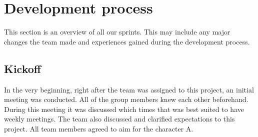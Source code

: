 \chapter{Development process}
\label{sec:sprintOverview}
This section is an overview of all our sprints. This may include any major changes the team made and experiences gained during the development process. 

\section{Kickoff}
In the very beginning, right after the team was assigned to this project, an initial meeting was conducted. All of the group members knew each other beforehand. During this meeting it was discussed which times that was best suited to have weekly meetings. The team also discussed and clarified expectations to this project. All team members agreed to aim for the character A.











